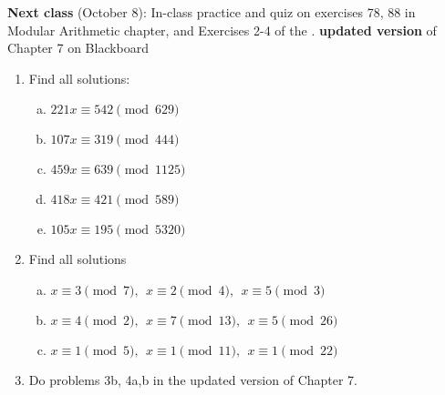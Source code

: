 {\bf Next class} (October 8): In-class practice and quiz on exercises 78, 88 in Modular Arithmetic chapter, and Exercises 2-4 of the .  {\bf updated version}  of Chapter 7  on Blackboard


\begin{enumerate}
\item
Find all solutions:
\begin{enumerate}[(a)]
\item
$221 x \equiv 542 \pmod{629}$
\item
$107x \equiv 319 \pmod{444}$
\item
$459x \equiv 639 \pmod{1125}$
\item
$418 x \equiv 421 \pmod{589}$
\item
$105x \equiv 195 \pmod{5320}$
\end{enumerate}
\item
Find all solutions
\begin{enumerate}[(a)]
\item
$x \equiv 3 \pmod{7},~~x\equiv 2 \pmod{4},~~ x\equiv 5 \pmod{3}$
\item
$x\equiv 4 \pmod{2},~~x \equiv 7 \pmod{13}, ~~ x \equiv 5 \pmod{26}$
\item
$x\equiv 1 \pmod{5},~~ x\equiv 1 \pmod{11},~~x\equiv 1 \pmod{22}$
\end{enumerate}
\item
Do problems 3b, 4a,b in the updated version of Chapter 7.
\end{enumerate}




